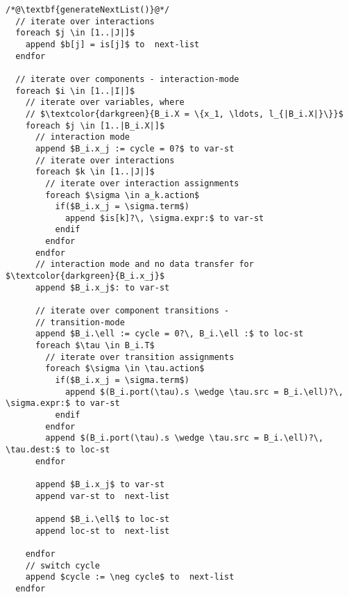 \begin{lstlisting}
/*@\textbf{generateNextList()}@*/ 
  // iterate over interactions
  foreach $j \in [1..|J|]$ 
    append $b[j] = is[j]$ to  next-list 
  endfor

  // iterate over components - interaction-mode
  foreach $i \in [1..|I|]$ 
    // iterate over variables, where 
    // $\textcolor{darkgreen}{B_i.X = \{x_1, \ldots, l_{|B_i.X|}\}}$ 
    foreach $j \in [1..|B_i.X|]$ 
      // interaction mode
      append $B_i.x_j := cycle = 0?$ to var-st
      // iterate over interactions
      foreach $k \in [1..|J|]$ 
        // iterate over interaction assignments
        foreach $\sigma \in a_k.action$
          if($B_i.x_j = \sigma.term$)
            append $is[k]?\, \sigma.expr:$ to var-st
          endif
        endfor
      endfor
      // interaction mode and no data transfer for $\textcolor{darkgreen}{B_i.x_j}$
      append $B_i.x_j$: to var-st 
      
      // iterate over component transitions - 
      // transition-mode
      append $B_i.\ell := cycle = 0?\, B_i.\ell :$ to loc-st
      foreach $\tau \in B_i.T$ 
        // iterate over transition assignments
        foreach $\sigma \in \tau.action$
          if($B_i.x_j = \sigma.term$)
            append $(B_i.port(\tau).s \wedge \tau.src = B_i.\ell)?\, \sigma.expr:$ to var-st 
          endif
        endfor
        append $(B_i.port(\tau).s \wedge \tau.src = B_i.\ell)?\, \tau.dest:$ to loc-st 
      endfor  
      
      append $B_i.x_j$ to var-st 
      append var-st to  next-list 
      
      append $B_i.\ell$ to loc-st 
      append loc-st to  next-list 

    endfor
    // switch cycle
    append $cycle := \neg cycle$ to  next-list 
  endfor
\end{lstlisting}
%

